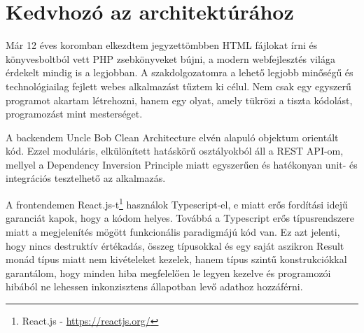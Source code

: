 \section{Kedvhozó az architektúrához}
Már 12 éves koromban elkezdtem jegyzettömbben HTML fájlokat írni és könyvesboltból vett PHP zsebkönyveket bújni, a modern webfejlesztés világa érdekelt mindig is a legjobban. A szakdolgozatomra a lehető legjobb minőségű és technológiailag fejlett webes alkalmazást tűztem ki célul. Nem csak egy egyszerű programot akartam létrehozni, hanem egy olyat, amely tükrözi a tiszta kódolást, programozást mint mesterséget.

A backendem Uncle Bob Clean Architecture \cite{cleanArchitecturePost} elvén alapuló objektum orientált kód. Ezzel moduláris, elkülönített hatáskörű osztályokból áll a REST API-om, mellyel a Dependency Inversion Principle miatt egyszerűen és hatékonyan unit- és integrációs tesztelhető az alkalmazás.

A frontendemen React.js-t\footnote{React.js - \href{https://reactjs.org/}{https://reactjs.org/}} használok Typescript-el, e miatt erős fordítási idejű garanciát kapok, hogy a kódom helyes. Továbbá a Typescript erős típusrendszere miatt a megjelenítés mögött funkcionális paradigmájú kód van. Ez azt jelenti, hogy nincs destruktív értékadás, összeg típusokkal és egy saját aszikron Result monád típus miatt nem kivételeket kezelek, hanem típus szintű konstrukciókkal garantálom, hogy minden hiba megfelelően le legyen kezelve és programozói hibából ne lehessen inkonzisztens állapotban levő adathoz hozzáférni.
